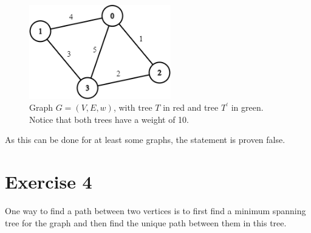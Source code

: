 \documentclass[nobib]{tufte-handout}
\begin{document}
\begin{figure}
    \centering
    \includegraphics[width=0.55\textwidth]{graphics/L6_prim_kruskal_dijkstra/distinctWeights.png}
    \caption{Graph $G = (V,E,w)$, with tree $T$ in red and tree $T^\prime$ in green. Notice that both trees have a weight of 10.}
    \label{fig:distinctWeights}
\end{figure}

As this can be done for at least some graphs, the statement is proven false.
\newpage

\section{Exercise 4}

  One way to find a path between two vertices is to first find a minimum spanning tree for the graph and then find the unique path between them in this tree.  
\end{document}
